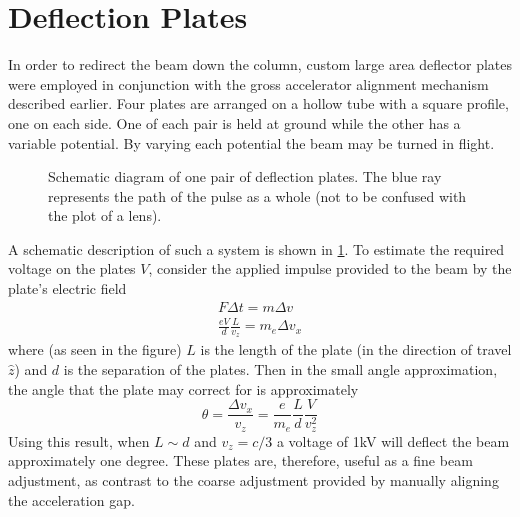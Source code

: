 
\section{Deflection Plates}

In order to redirect the beam down the column, custom large area deflector plates were employed in conjunction with the gross accelerator alignment mechanism described earlier.
Four plates are arranged on a hollow tube with a square profile, one on each side.
One of each pair is held at ground while the other has a variable potential.
By varying each potential the beam may be turned in flight.

\begin{figure}
  \centering
  
  \caption[Schematic diagram of one pair of deflection plates]{
    Schematic diagram of one pair of deflection plates.
    The blue ray represents the path of the pulse as a whole (not to be confused with the plot of a lens).
  }
  \label{fig:deflector_schematic}
\end{figure}

A schematic description of such a system is shown in \ref{fig:deflector_schematic}.
To estimate the required voltage on the plates $V$, consider the applied impulse provided to the beam by the plate's electric field
\begin{gather}
  F \Delta t = m \Delta v \\
  \frac{ e V }{ d } \frac{ L }{ v_z } = m_e \Delta v_x
\end{gather}
where (as seen in the figure) $L$ is the length of the plate (in the direction of travel $\hat{z}$) and $d$ is the separation of the plates.
Then in the small angle approximation, the angle that the plate may correct for is approximately
\begin{equation}
  \theta = \frac{ \Delta v_x }{ v_z } = \frac{ e }{ m_e } \frac{ L }{ d } \frac{ V }{ v_z^2 }
\end{equation}
Using this result, when $L \sim d$ and $v_z = c/3$ a voltage of 1kV will deflect the beam approximately one degree.
These plates are, therefore, useful as a fine beam adjustment, as contrast to the coarse adjustment provided by manually aligning the acceleration gap.

